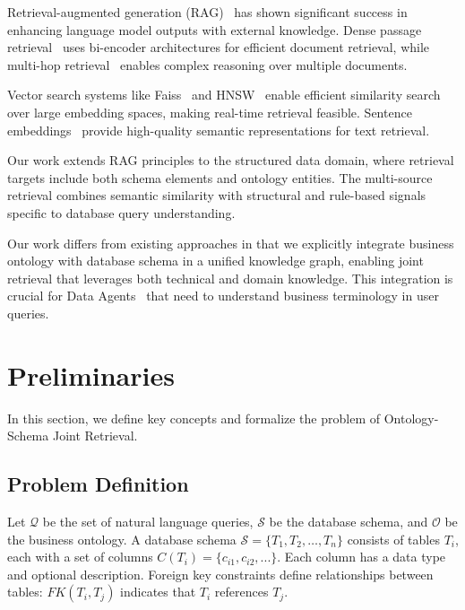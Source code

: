 \documentclass[sigconf, nonatbib]{acmart}
\begin{document}
Retrieval-augmented generation (RAG)~\cite{lewis2020retrieval,guu2020retrieval} has shown significant success in enhancing language model outputs with external knowledge. Dense passage retrieval~\cite{karpukhin2020dense} uses bi-encoder architectures for efficient document retrieval, while multi-hop retrieval~\cite{xiong2020answering} enables complex reasoning over multiple documents.

Vector search systems like Faiss~\cite{johnson2019faiss} and HNSW~\cite{malkov2018efficient} enable efficient similarity search over large embedding spaces, making real-time retrieval feasible. Sentence embeddings~\cite{reimers2019sentence,xiao2023bge} provide high-quality semantic representations for text retrieval.

Our work extends RAG principles to the structured data domain, where retrieval targets include both schema elements and ontology entities. The multi-source retrieval combines semantic similarity with structural and rule-based signals specific to database query understanding.

Our work differs from existing approaches in that we explicitly integrate business ontology with database schema in a unified knowledge graph, enabling joint retrieval that leverages both technical and domain knowledge. This integration is crucial for Data Agents~\cite{li2024data,yang2023foundation} that need to understand business terminology in user queries.

\section{Preliminaries}
\label{sec:preliminaries}

In this section, we define key concepts and formalize the problem of Ontology-Schema Joint Retrieval.

\subsection{Problem Definition}

Let $\mathcal{Q}$ be the set of natural language queries, $\mathcal{S}$ be the database schema, and $\mathcal{O}$ be the business ontology. A database schema $\mathcal{S} = \{T_1, T_2, \ldots, T_n\}$ consists of tables $T_i$, each with a set of columns $C(T_i) = \{c_{i1}, c_{i2}, ...\}$. Each column has a data type and optional description. Foreign key constraints define relationships between tables: $FK(T_i, T_j)$ indicates that $T_i$ references $T_j$.
\end{document}
